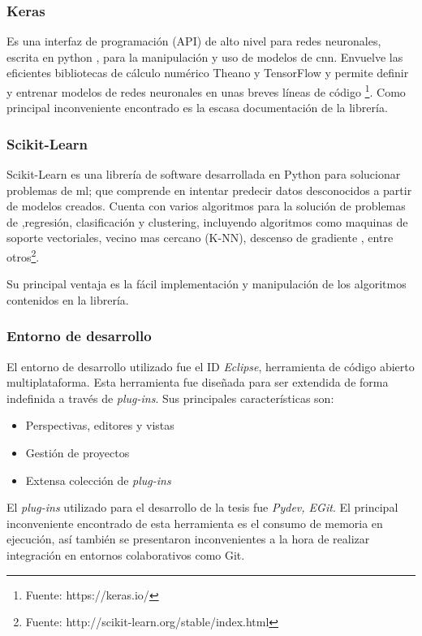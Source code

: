 \subsubsection*{Keras}

Es una interfaz de programación (API) de alto nivel para redes neuronales, escrita en python , para la manipulación y uso de modelos de \ac{cnn}. Envuelve las eficientes bibliotecas de cálculo numérico Theano y TensorFlow y permite definir y entrenar modelos de redes neuronales en unas breves líneas de código \footnote{Fuente:  https://keras.io/}. Como principal inconveniente encontrado es la escasa documentación de la librería.

\subsubsection*{Scikit-Learn}\label{sub:sklearn}
Scikit-Learn es una librería de software desarrollada en Python para solucionar problemas de \ac{ml}; que comprende en intentar predecir datos desconocidos a partir de modelos creados. Cuenta con varios algoritmos para la solución de problemas de ,regresión, clasificación y clustering, incluyendo algoritmos como maquinas de soporte vectoriales, vecino mas cercano (K-NN), descenso de gradiente , entre otros\footnote{Fuente: http://scikit-learn.org/stable/index.html}.

Su principal ventaja es la fácil implementación y manipulación de los algoritmos contenidos en la librería.

\subsubsection*{Entorno de desarrollo}
El entorno de desarrollo utilizado fue el ID \textit{Eclipse}, herramienta de código abierto multiplataforma. Esta herramienta fue diseñada para ser extendida de forma indefinida a través de \textit{plug-ins}. Sus principales características son:
\begin{itemize}
 \item Perspectivas, editores y vistas
 \item Gestión de proyectos
 \item Extensa colección de \textit{plug-ins}
\end{itemize}
El \textit{plug-ins} utilizado para el desarrollo de la tesis fue \textit{Pydev, EGit}. El principal inconveniente encontrado de esta herramienta es 
el consumo de memoria en ejecución, así también se presentaron inconvenientes a la hora de realizar integración en entornos colaborativos como Git.

